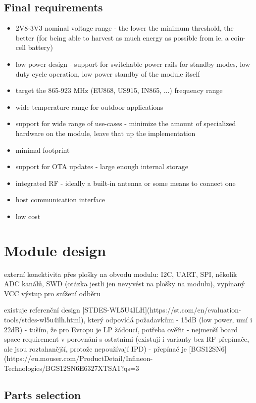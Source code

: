 \subsection{Final requirements}
\begin{itemize}
    \item 2V8-3V3 nominal voltage range - the lower the minimum threshold, the better (for being able to harvest as much energy as possible from ie. a coin-cell battery)
    \item low power design - support for switchable power rails for standby modes, low duty cycle operation, low power standby of the module itself
    \item target the 865-923 MHz (EU868, US915, IN865, ...) frequency range
    \item wide temperature range for outdoor applications
    \item support for wide range of use-cases - minimize the amount of specialized hardware on the module, leave that up the implementation
    \item minimal footprint
    \item support for OTA updates - large enough internal storage
    \item integrated RF - ideally a built-in antenna or some means to connect one
    \item host communication interface
    \item low cost
\end{itemize}

\section{Module design}
externí konektivita přes plošky na obvodu modulu: I2C, UART, SPI, několik ADC kanálů, SWD (otázka jestli jen nevyvést na plošky na modulu), vypínaný VCC výstup pro snížení odběru

existuje referenční design [STDES-WL5U4ILH](https://st.com/en/evaluation-tools/stdes-wl5u4ilh.html), který odpovídá požadavkům
	- 15dB (low power, umí i 22dB) - tuším, že pro Evropu je LP žádoucí, potřeba ověřit
	- nejmenší board space requirement v porovnání s ostatními (existují i varianty bez RF přepínače, ale jsou roztahanější, protože nepoužívají IPD)
	- přepínač je [BGS12SN6](https://eu.mouser.com/ProductDetail/Infineon-Technologies/BGS12SN6E6327XTSA1?qs=3%

\subsection{Parts selection}
